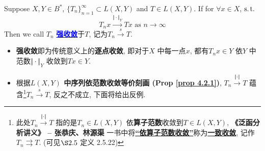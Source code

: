 	\vspace*{1em}
	
	\begin{defn}\label{def 4.3.1}
		Suppose $X , Y \in B^*$, $\{ T_n \}_{n = 1}^{\infty} \subset L(X , Y)$ and $T \in L(X , Y)$. If for $\forall x \in X$, $\operatorname{s.t.}$ 
		\[ T_n x \overset{\Vert \cdot \Vert_Y}{\to} Tx \,\, \text{as} \,\, n \to \infty \]
		Then we call $T_n$ \underline{\textcolor{blue}{\textbf{强收敛}}}于$T$, 记为$T_n \overset{s}{\to} T$. 
		
		\vspace*{2em}
		
		\begin{rmk}
			\begin{itemize}
				\item \textbf{强收敛}即为传统意义上的\textbf{逐点收敛}, 即对于$X$ 中每一点$x$, 都有$T_nx \in Y$ 依$Y$ 中范数$\Vert \cdot \Vert_Y$ 收敛到$Tx \in Y$. 
				
				\vspace*{2em}
				
				\item 根据\textbf{$L(X , Y)$ 中序列依范数收敛等价刻画 (Prop \ref{prop 4.2.1})}, $T_n \overset{\Vert \cdot \Vert}{\to} T$ 蕴含\footnote{此处$T_n \overset{\Vert \cdot \Vert}{\to} T$ 指的是$T_n \in L(X , Y)$ 依\textbf{算子范数}收敛到$T \in L(X , Y)$, \textbf{《泛函分析讲义》 -- 张恭庆、林源渠} 一书中将\underline{\textbf{“依算子范数收敛”}}称为\underline{\textbf{一致收敛}}, 记作$T_n \rightrightarrows T$. (可见$\S 2.5$ 定义 2.5.22)}$T_n \overset{s}{\to} T$, 反之不成立, 下面将给出反例. 
			\end{itemize}
		\end{rmk}
	\end{defn}
	
	\vspace*{3em}

